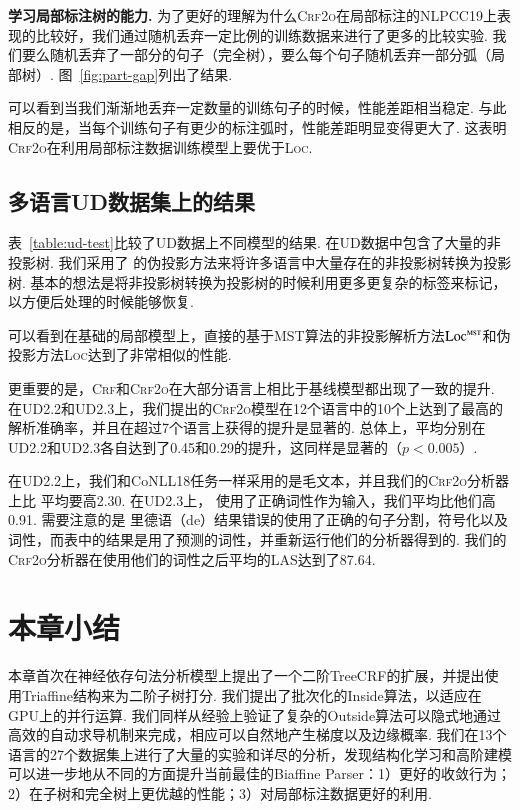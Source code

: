 \noindent\textbf{学习局部标注树的能力.}
为了更好的理解为什么\textsc{Crf2o}在局部标注的NLPCC19上表现的比较好，我们通过随机丢弃一定比例的训练数据来进行了更多的比较实验.
我们要么随机丢弃了一部分的句子（完全树），要么每个句子随机丢弃一部分弧（局部树）.
图~\ref{fig:part-gap}列出了结果.

可以看到当我们渐渐地丢弃一定数量的训练句子的时候，性能差距相当稳定.
与此相反的是，当每个训练句子有更少的标注弧时，性能差距明显变得更大了.
这表明\textsc{Crf2o}在利用局部标注数据训练模型上要优于\textsc{Loc}.



\subsection{多语言UD数据集上的结果}

表~\ref{table:ud-test}比较了UD数据上不同模型的结果.
在UD数据中包含了大量的非投影树.
我们采用了 \citep{nivre-nilsson-2005-pseudo}的伪投影方法来将许多语言中大量存在的非投影树转换为投影树.
基本的想法是将非投影树转换为投影树的时候利用更多更复杂的标签来标记，以方便后处理的时候能够恢复.

可以看到在基础的局部模型上，直接的基于MST算法的非投影解析方法$\textsc{Loc}^{\textsc{mst}}$和伪投影方法\textsc{Loc}达到了非常相似的性能.

更重要的是，\textsc{Crf}和\textsc{Crf2o}在大部分语言上相比于基线模型都出现了一致的提升.
在UD2.2和UD2.3上，我们提出的\textsc{Crf2o}模型在12个语言中的10个上达到了最高的解析准确率，并且在超过7个语言上获得的提升是显著的.
总体上，平均分别在UD2.2和UD2.3各自达到了0.45和0.29的提升，这同样是显著的（$p<0.005$）.

在UD2.2上，我们和CoNLL18任务一样采用的是毛文本，并且我们的\textsc{Crf2o}分析器上比 \citep{ji-etal-2019-graph}平均要高2.30.
在UD2.3上， \citep{zhang-etal-2019-empirical}使用了正确词性作为输入，我们平均比他们高0.91.
需要注意的是 \citep{ji-etal-2019-graph}里德语（de）结果错误的使用了正确的句子分割，符号化以及词性，而表中的结果是用了预测的词性，并重新运行他们的分析器得到的.
我们的\textsc{Crf2o}分析器在使用他们的词性之后平均的LAS达到了87.64.

\section{本章小结}
\label{sec:dep-conclusions}

本章首次在神经依存句法分析模型上提出了一个二阶TreeCRF的扩展，并提出使用Triaffine结构来为二阶子树打分.
我们提出了批次化的Inside算法，以适应在GPU上的并行运算.
我们同样从经验上验证了复杂的Outside算法可以隐式地通过高效的自动求导机制来完成，相应可以自然地产生梯度以及边缘概率.
我们在13个语言的27个数据集上进行了大量的实验和详尽的分析，发现结构化学习和高阶建模可以进一步地从不同的方面提升当前最佳的Biaffine Parser：1）更好的收敛行为；2）在子树和完全树上更优越的性能；3）对局部标注数据更好的利用.
